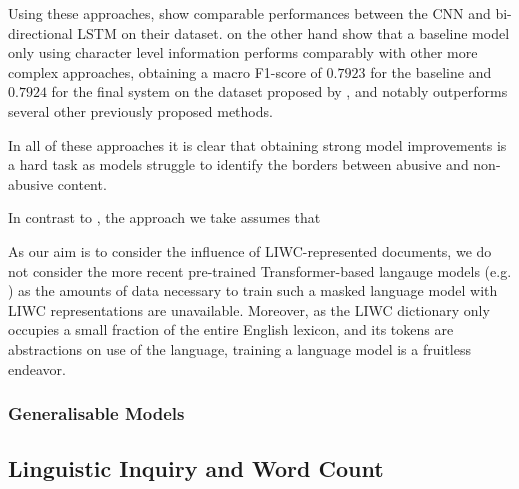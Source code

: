 Using these approaches, \citet{Kolhatkar:2021} show comparable performances between the CNN and bi-directional LSTM on their dataset. \citet{Meyer:2019} on the other hand show that a baseline model only using character level information performs comparably with other more complex approaches, obtaining a macro F1-score of $0.7923$ for the baseline and $0.7924$ for the final system on the dataset proposed by \citet{Waseem-Hovy:2016}, and notably outperforms several other previously proposed methods.\vspace{5mm}

In all of these approaches it is clear that obtaining strong model improvements is a hard task as models struggle to identify the borders between abusive and non-abusive content.






In contrast to \citet{Wang:2020}, the approach we take assumes that

\cite{Zimmerman:2018,Park:2017,Gamback:2017}

As our aim is to consider the influence of LIWC-represented documents, we do not consider the more recent pre-trained Transformer-based langauge models (e.g. \cite{Devlin:2019, CITE: Roberta}) as the amounts of data necessary to train such a masked language model with LIWC representations are unavailable. Moreover, as the LIWC dictionary only occupies a small fraction of the entire English lexicon, and its tokens are abstractions on use of the language, training a language model is a fruitless endeavor.

\subsubsection{Generalisable Models}

\cite{Waseem:2016,Waseem:2018,Karan:2018,Wiegand:2019}

\subsection{Linguistic Inquiry and Word Count}







